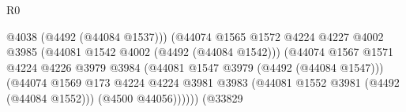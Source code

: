\begin{lexlean}{R0}
\begin{coremodule}
                                                            @4038
                                                            (@4492 (@44084 @1537)))
                                                          (@44074
                                                            @1565
                                                            @1572
                                                            @4224
                                                            @4227
                                                            @4002
                                                            @3985
                                                            (@44081
                                                              @1542
                                                              @4002
                                                              (@4492 (@44084 @1542)))
                                                            (@44074
                                                              @1567
                                                              @1571
                                                              @4224
                                                              @4226
                                                              @3979
                                                              @3984
                                                              (@44081
                                                                @1547
                                                                @3979
                                                                (@4492 (@44084 @1547)))
                                                              (@44074
                                                                @1569
                                                                @173
                                                                @4224
                                                                @4224
                                                                @3981
                                                                @3983
                                                                (@44081
                                                                  @1552
                                                                  @3981
                                                                  (@4492 (@44084 @1552)))
                                                                (@4500 @44056))))))
                                                      (@33829

\end{coremodule}
\end{lexlean}
